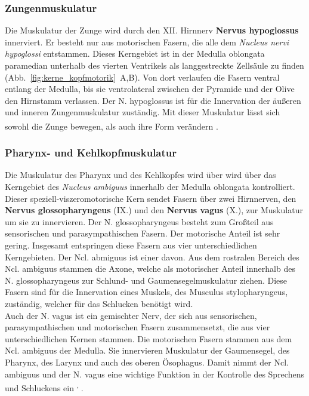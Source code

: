 \subsubsection*{Zungenmuskulatur}
Die Muskulatur der Zunge wird durch den XII. Hirnnerv \textbf{Nervus hypoglossus}  innerviert. Er besteht nur aus motorischen Fasern, die alle dem \textit{Nucleus nervi hypoglossi}  entstammen. Dieses Kerngebiet ist in der Medulla oblongata paramedian unterhalb des vierten Ventrikels als langgestreckte Zellsäule zu finden (Abb.~\ref{fig:kerne_kopfmotorik}~A,B). Von dort verlaufen die Fasern ventral entlang der Medulla, bis sie ventrolateral zwischen der Pyramide und der Olive den Hirnstamm verlassen. Der N. hypoglossus ist für die Innervation der äußeren und inneren Zungenmuskulatur zuständig. Mit dieser Muskulatur lässt sich sowohl die Zunge bewegen, als auch ihre Form verändern \textsuperscript{\cite[Kap.~10]{crossman2014neuroanatomy}}.

\subsubsection*{Pharynx- und Kehlkopfmuskulatur}
Die Muskulatur des Pharynx und des Kehlkopfes wird über wird über das Kerngebiet des \textit{Nucleus ambiguus}  innerhalb der Medulla oblongata kontrolliert. Dieser speziell-viszeromotorische Kern sendet Fasern über zwei Hirnnerven, den \textbf{Nervus glossopharyngeus} (IX.)  und den \textbf{Nervus vagus} (X.), zur Muskulatur um sie zu innervieren. Der N. glossopharyngeus besteht zum Großteil aus sensorischen und parasympathischen Fasern. Der motorische Anteil ist sehr gering. Insgesamt entspringen diese Fasern aus vier unterschiedlichen Kerngebieten. Der Ncl. abmiguus ist einer davon. Aus dem rostralen Bereich des Ncl. ambiguus stammen die Axone, welche als motorischer Anteil innerhalb des N. glossopharyngeus zur Schlund- und Gaumensegelmuskulatur ziehen. Diese Fasern sind für die Innervation eines Muskels, des Musculus stylopharyngeus, zuständig, welcher für das Schlucken benötigt wird. \\
Auch der N. vagus ist ein gemischter Nerv, der sich aus sensorischen, parasympathischen und motorischen Fasern zusammensetzt, die aus vier unterschiedlichen Kernen stammen. Die motorischen Fasern stammen aus dem Ncl. ambiguus der Medulla. Sie innervieren Muskulatur der Gaumensegel, des Pharynx, des Larynx und auch des oberen Ösophagus. Damit nimmt der Ncl. ambiguus und der N. vagus eine wichtige Funktion in der Kontrolle des Sprechens und Schluckens ein \textsuperscript{\cite[Kap.~10]{crossman2014neuroanatomy}, \cite[5]{trepel2011neuroanatomie}}.       

